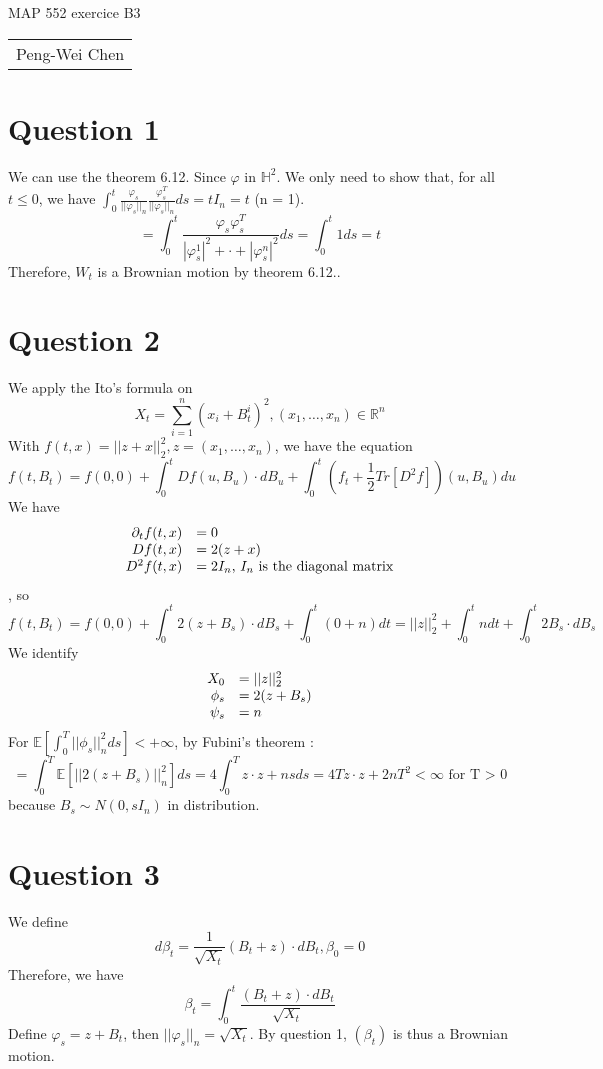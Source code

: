 \documentclass[12pt]{article}
\newcommand{\1}{\mathbb{I}} %
\begin{document}
\begin{center}
{\Large MAP 552 exercice B3}

\begin{tabular}{c}
Peng-Wei Chen\\
\end{tabular}
\end{center}

\section*{Question 1}
We can use the theorem 6.12. Since $\varphi$ in $\mathbb{H}^2$. We only need to show that, for all $t \le 0$, we have $\int_0^t \frac{\varphi_s}{||\varphi_s||_n} \frac{\varphi_s^T}{||\varphi_s||_n} ds= tI_n = t$ (n = 1).
\[
    = \int_0^t \frac{\varphi_s \varphi_s^T}{|\varphi_s^1|^2 + \cdot + |\varphi_s^n|^2} ds = \int_0^t 1ds = t
\]
Therefore, $W_t$ is a Brownian motion by theorem 6.12..

\section*{Question 2}
We apply the Ito's formula on 
\[
    X_t = \sum_{i=1}^{n} \left(x_i + B_t^i\right)^2, \left( x_1,\dots,x_n \right) \in \mathbb{R}^n
\]
With $f(t, x) = ||z + x||^2_2, z = \left( x_1,\dots,x_n \right)$, we have the equation
\[
    f(t, B_t) = f(0, 0) + \int_{0}^{t} Df(u, B_u)\cdot dB_u + \int_{0}^{t}\left(f_t + \frac{1}{2} Tr\left[ D^2f \right]\right)(u, B_u)du
\]
We have
\[
    \begin{array}[ht!]{r l}
        \partial_t f(t, x) &= 0\\
        Df(t, x) & = 2(z + x)\\
        D^2f(t, x) & = 2I_n\mbox{, }I_n\mbox{ is the diagonal matrix}\\
    \end{array}
\]
, so
\[
    f(t, B_t) = f(0, 0) + \int_{0}^{t} 2(z + B_s)\cdot dB_s + \int_{0}^{t} (0 + n)dt = ||z||_2^2 + \int_{0}^{t}ndt + \int_0^t 2B_s\cdot dB_s
\]
We identify
\[
    \begin{array}[ht!]{r l}
        X_0 & = ||z||_2^2\\
        \phi_s & = 2(z + B_s)\\
        \psi_s & = n\\

    \end{array}
\]
For $\mathbb{E}\left[ \int_0^T||\phi_s||_n^2ds \right] < +\infty$, by Fubini's theorem :
\[
    = \int_0^T \mathbb{E}\left[||2(z + B_s)||_n^2\right] ds = 4\int_{0}^{T} z\cdot z + ns ds = 4Tz\cdot z +2nT^2 < \infty \mbox{ for T > 0}
\]
because $B_s \sim N\left( 0, sI_n \right)$ in distribution.

\section*{Question 3}
We define 
\[
    d\beta_t = \frac{1}{\sqrt{X_t}}(B_t + z)\cdot dB_t, \beta_0 = 0
\]
Therefore, we have
\[
    \beta_t = \int_0^t \frac{(B_t + z)\cdot dB_t}{\sqrt{X_t}}
\]
Define $\varphi_s = z + B_t$, then $||\varphi_s||_n = \sqrt{X_t}$. By question 1, $(\beta_t)$ is thus a Brownian motion. 
\end{document}
